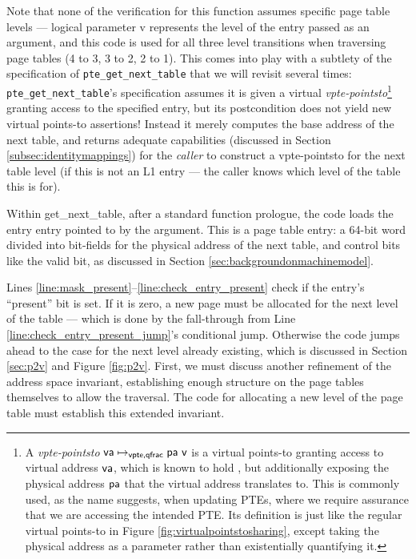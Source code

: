 Note that none of the verification for this function assumes specific page table levels --- logical parameter \textsf{v} represents the level
of the entry passed as an argument, and this code
is used for all three level transitions when traversing page tables (4 to 3, 3 to 2, 2 to 1).
This comes into play with a subtlety of the specification of \lstinline|pte_get_next_table| that we will
revisit several times: \lstinline|pte_get_next_table|'s specification
assumes it is given a virtual \emph{vpte-pointsto}\footnote{A \emph{vpte-pointsto}
$\mathsf{va}\mapsto_{\textsf{vpte,qfrac}} \textsf{\textsf{pa}~v}$ is a virtual points-to granting
access to virtual address $\mathsf{va}$, which is known to hold \textsf{\val}, but additionally exposing the physical address
$\textsf{pa}$ that the virtual address translates to. This is commonly used, as the name suggests, when updating PTEs,
where we require assurance that we are accessing the intended PTE.
Its definition is just like the regular virtual points-to in Figure \ref{fig:virtualpointstosharing},
except taking the physical address as a parameter rather than existentially quantifying it.
}
 granting access to the specified entry,
but its postcondition does not yield new virtual points-to assertions!
Instead it merely computes the base address of the next table, and returns adequate capabilities (discussed in Section \ref{subsec:identitymappings})
for the \emph{caller} to construct a vpte-pointsto for the next table level (if this is not an L1 entry ---
the caller knows which level of the table this is for).

Within \textsf{get\_next\_table}, after a standard function prologue, the code 
loads the entry \textsf{entry} pointed to by the argument.
This is a page table entry: a 64-bit word divided into bit-fields for
the physical address of the next table, and control bits like the valid bit, as discussed in 
Section \ref{sec:backgroundonmachinemodel}.



Lines \ref{line:mask_present}--\ref{line:check_entry_present} check if the entry's ``present'' bit is set.
If it is zero, a new page must be allocated for the next level of the table --- which is done by the fall-through
from Line \ref{line:check_entry_present_jump}'s conditional jump. Otherwise the code jumps ahead to
the case for the next level already existing, which is discussed in Section \ref{sec:p2v} and Figure \ref{fig:p2v}.
First, we must discuss another refinement of the address space invariant, establishing
enough structure on the page tables themselves to allow the traversal.
The code for allocating a new level of the page table must establish this extended invariant.


